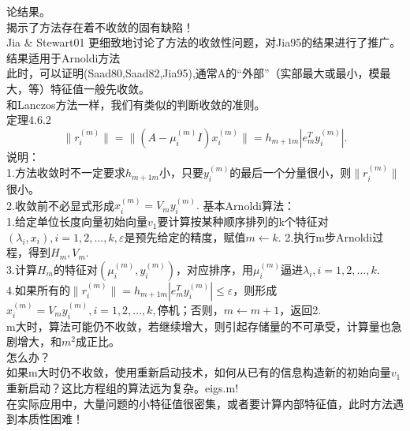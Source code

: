 \documentclass[a4paper,12pt]{article}
\begin{document}
\begin{CJK*}{UTF8}{gbsn}
	论结果。\\
	揭示了方法存在着不收敛的固有缺陷！\\
	Jia \& Stewart01 更细致地讨论了方法的收敛性问题，对Jia95的结果进行了推广。\\
	结果适用于Arnoldi方法\\
	此时，可以证明(Saad80,Saad82,Jia95),通常A的“外部”（实部最大或最小，模最大，等）特征值一般先收敛。\\
	和Lanczos方法一样，我们有类似的判断收敛的准则。\\
	定理4.6.2
	$$ \|r_i^{(m)}\| = \|(A-\mu_i^{(m)}I)x_i^{(m)}\| = h_{m+1m}|e_m^Ty_i^{(m)}|.$$
	说明：\\
	1.方法收敛时不一定要求$h_{m+1m}$小，只要$y_i^{(m)}$的最后一个分量很小，则$\|r_i^{(m)}\|$很小。\\
	2.收敛前不必显式形成$x_i^{(m)}=V_my_i^{(m)}.$
	基本Arnoldi算法：\\
	1.给定单位长度向量初始向量$v_1$要计算按某种顺序排列的k个特征对$(\lambda_i,x_i),i=1,2,\ldots,k,\varepsilon$是预先给定的精度，赋值$m\leftarrow k.$
	2.执行m步Arnoldi过程，得到$H_m,V_m.$\\
	3.计算$H_m$的特征对$(\mu_i^{(m)},y_i^{(m)})$，对应排序，用$\mu_i^{(m)}$逼进$\lambda_i,i=1,2,\ldots,k.$\\
	4.如果所有的$\|r_i^{(m)}\| = h_{m+1m}|e_m^Ty_i^{(m)}|\le \varepsilon$，则形成$x_i^{(m)} = V_my_i^{(m)},i=1,2,\ldots,k,$停机；否则，$m\leftarrow m+1$，返回2.\\
	m大时，算法可能仍不收敛，若继续增大，则引起存储量的不可承受，计算量也急剧增大，和$m^2$成正比。\\
	怎么办？\\
	如果m大时仍不收敛，使用重新启动技术，如何从已有的信息构造新的初始向量$v_1$重新启动？这比方程组的算法远为复杂。eigs.m!\\
	在实际应用中，大量问题的小特征值很密集，或者要计算内部特征值，此时方法遇到本质性困难！\\

\end{CJK*}
\end{document}
